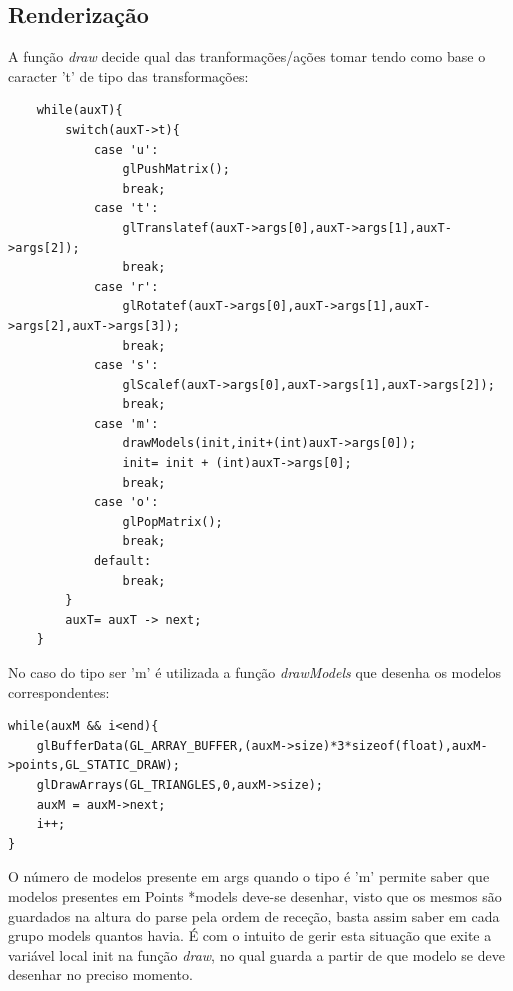 \documentclass{article}
\begin{document}
\subsection{Renderização}
A função \textit{draw} decide qual das tranformações/ações tomar tendo como base o caracter 't' de tipo das transformações:
\begin{verbatim}
    while(auxT){
        switch(auxT->t){
            case 'u':
                glPushMatrix();
                break;
            case 't':
                glTranslatef(auxT->args[0],auxT->args[1],auxT->args[2]);
                break;
            case 'r':
                glRotatef(auxT->args[0],auxT->args[1],auxT->args[2],auxT->args[3]);
                break;
            case 's':
                glScalef(auxT->args[0],auxT->args[1],auxT->args[2]);
                break;
            case 'm':
                drawModels(init,init+(int)auxT->args[0]);
                init= init + (int)auxT->args[0];
                break;
            case 'o':
                glPopMatrix();
                break;
            default:
                break;
        }
        auxT= auxT -> next;
    }
\end{verbatim} 
No caso do tipo ser 'm' é utilizada a função \textit{drawModels} que desenha os modelos correspondentes:
\begin{verbatim}
while(auxM && i<end){
    glBufferData(GL_ARRAY_BUFFER,(auxM->size)*3*sizeof(float),auxM->points,GL_STATIC_DRAW);
    glDrawArrays(GL_TRIANGLES,0,auxM->size);
    auxM = auxM->next;
    i++;
}
\end{verbatim}
O número de modelos presente em args quando o tipo é 'm' permite saber que modelos presentes em Points *models deve-se desenhar, visto que os mesmos são guardados na altura do parse pela ordem de receção, basta assim saber em cada grupo models quantos havia. É com o intuito de gerir esta situação que exite a variável local init na função \textit{draw}, no qual guarda a partir de que modelo se deve desenhar no preciso momento.
\end{document}
